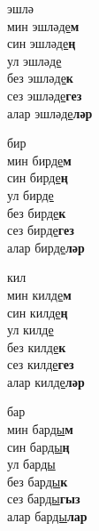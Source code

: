 \begin{multicols}{4}
\begin{enumerate}
\begin{minipage}{\linewidth}
    \item
    эшлә\\
    мин эшлә\underline{де}\textbf{м}\\
    син эшлә\underline{де}\textbf{ң}\\
    ул эшлә\underline{де}\\
    без эшлә\underline{де}\textbf{к}\\
    сез эшлә\underline{де}\textbf{гез}\\
    алар эшлә\underline{де}\textbf{ләр}\\
\end{minipage}

\begin{minipage}{\linewidth}
    \item
    бир\\
    мин бир\underline{де}\textbf{м}\\
    син бир\underline{де}\textbf{ң}\\
    ул бир\underline{де}\\
    без бир\underline{де}\textbf{к}\\
    сез бир\underline{де}\textbf{гез}\\
    алар бир\underline{де}\textbf{ләр}\\
\end{minipage}

\begin{minipage}{\linewidth}
    \item
    кил\\
    мин кил\underline{де}\textbf{м}\\
    син кил\underline{де}\textbf{ң}\\
    ул кил\underline{де}\\
    без кил\underline{де}\textbf{к}\\
    сез кил\underline{де}\textbf{гез}\\
    алар кил\underline{де}\textbf{ләр}\\
\end{minipage}

\begin{minipage}{\linewidth}
    \item
    бар\\
    мин бар\underline{ды}\textbf{м}\\
    син бар\underline{ды}\textbf{ң}\\
    ул бар\underline{ды}\\
    без бар\underline{ды}\textbf{к}\\
    сез бар\underline{ды}\textbf{гыз}\\
    алар бар\underline{ды}\textbf{лар}\\
\end{minipage}


\end{enumerate}
\end{multicols}
